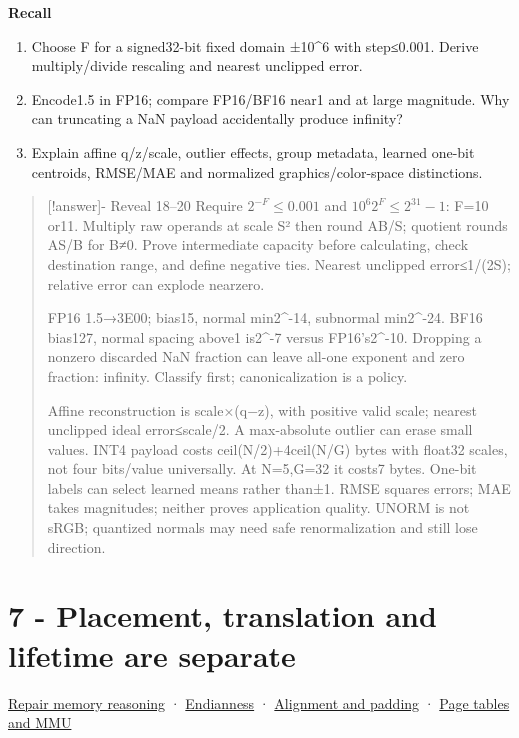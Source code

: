 \textbf{Recall}

\begin{enumerate}
\def\labelenumi{\arabic{enumi}.}
\setcounter{enumi}{17}
\tightlist
\item
  Choose F for a signed32-bit fixed domain ±10\^{}6 with step≤0.001. Derive multiply/divide rescaling and nearest unclipped error.
\item
  Encode1.5 in FP16; compare FP16/BF16 near1 and at large magnitude. Why can truncating a NaN payload accidentally produce infinity?
\item
  Explain affine q/z/scale, outlier effects, group metadata, learned one-bit centroids, RMSE/MAE and normalized graphics/color-space distinctions.
\end{enumerate}

\begin{quote}
{[}!answer{]}- Reveal 18--20 Require \(2^{-F}\le0.001\) and \(10^6 2^F\le2^{31}-1\): F=10 or11. Multiply raw operands at scale S² then round AB/S; quotient rounds AS/B for B≠0. Prove intermediate capacity before calculating, check destination range, and define negative ties. Nearest unclipped error≤1/(2S); relative error can explode nearzero.

FP16 1.5→3E00; bias15, normal min2\^{}-14, subnormal min2\^{}-24. BF16 bias127, normal spacing above1 is2\^{}-7 versus FP16's2\^{}-10. Dropping a nonzero discarded NaN fraction can leave all-one exponent and zero fraction: infinity. Classify first; canonicalization is a policy.

Affine reconstruction is scale×(q−z), with positive valid scale; nearest unclipped ideal error≤scale/2. A max-absolute outlier can erase small values. INT4 payload costs ceil(N/2)+4ceil(N/G) bytes with float32 scales, not four bits/value universally. At N=5,G=32 it costs7 bytes. One-bit labels can select learned means rather than±1. RMSE squares errors; MAE takes magnitudes; neither proves application quality. UNORM is not sRGB; quantized normals may need safe renormalization and still lose direction.
\end{quote}

\section{7 - Placement, translation and lifetime are separate}\label{appendix-ef4d27797a92-placement-translation-and-lifetime-are-separate}

\href{Continuous\%20Notes/Computing\%20Foundations\%20-\%20From\%20Bits\%20to\%20C++\%20and\%20Systems\%20APIs\#Where\%20the\%20bytes\%20live}{Repair memory reasoning} · \hyperref[appendix-bc07c3d25b18]{Endianness} · \hyperref[appendix-a1f7c53b4742]{Alignment and padding} · \hyperref[appendix-01e5905165c4]{Page tables and MMU}

